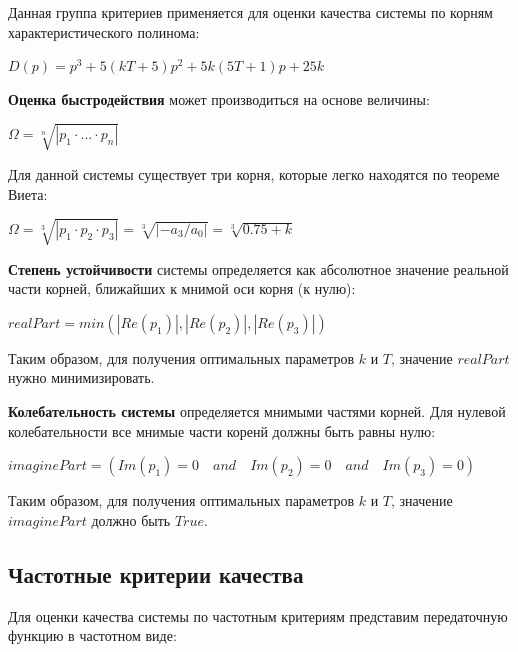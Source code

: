 \documentclass[14pt,a4paper,report]{report}
\begin{document}
	Данная группа критериев применяется для оценки качества системы по корням характеристического полинома:
	
	\begin{center}
		$D(p)=p^3+5(kT+5)p^2+5k(5T+1)p+25k$
	\end{center}
	
	\textbf{Оценка быстродействия} может производиться на основе величины:
	
	\begin{center}
		$\Omega=\sqrt[n]{|p_1\cdot...\cdot p_n|}$
	\end{center}
	
	Для данной системы существует три корня, которые легко находятся по теореме Виета:
	
	\begin{center}
		$\Omega=\sqrt[3]{|p_1\cdot p_2\cdot p_3|}=\sqrt[3]{|-a_3/a_0|}=\sqrt[3]{0.75+k}$
	\end{center}
	
	\textbf{Степень устойчивости} системы определяется как абсолютное значение реальной части корней, ближайших к мнимой оси корня (к нулю):
	
	\begin{center}
		$realPart = min(|Re(p_1)|, |Re(p_2)|, |Re(p_3)|)$
	\end{center}
	
	Таким образом, для получения оптимальных параметров $k$ и $T$, значение $realPart$ нужно минимизировать.
	
	\textbf{Колебательность системы} определяется мнимыми частями корней. Для нулевой колебательности все мнимые части коренй должны быть равны нулю:
	
	\begin{center}
		$imaginePart = (Im(p_1)=0\quad and\quad Im(p_2)=0\quad and\quad Im(p_3)=0)$
	\end{center}
	
	Таким образом, для получения оптимальных параметров $k$ и $T$, значение $imaginePart$ должно быть $True$.
	
	\subsection{Частотные критерии качества}
	
	Для оценки качества системы по частотным критериям представим передаточную функцию в частотном виде:
	
\end{document}
